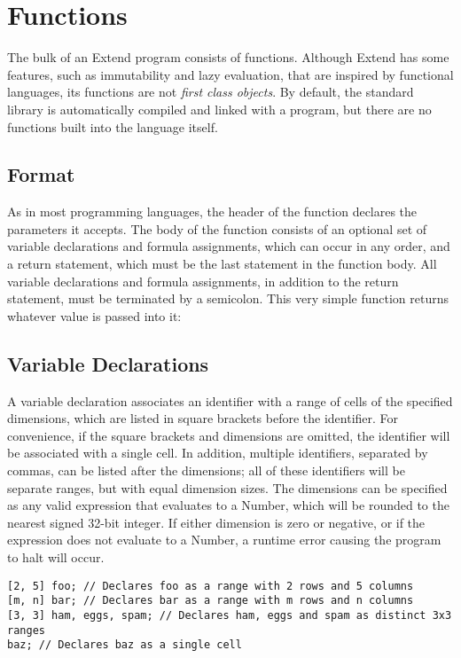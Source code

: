 \section{Functions}
\label{sec:Functions}
The bulk of an Extend program consists of functions. Although Extend has some features, such as immutability and lazy evaluation, that are inspired by functional languages, its functions are not \textit{first class objects}. By default, the standard library is automatically compiled and linked with a program, but there are no functions built into the language itself.
\subsection{Format}
\label{sec:funcdecl}
As in most programming languages, the header of the function declares the parameters it accepts. The body of the function consists of an optional set of variable declarations and formula assignments, which can occur in any order, and a return statement, which must be the last statement in the function body. All variable declarations and formula assignments, in addition to the return statement, must be terminated by a semicolon.
This very simple function returns whatever value is passed into it:

\subsection{Variable Declarations}
\label{sec:vardecl}
A variable declaration associates an identifier with a range of cells of the specified dimensions, which are listed in square brackets before the identifier. For convenience, if the square brackets and dimensions are omitted, the identifier will be associated with a single cell. In addition, multiple identifiers, separated by commas, can be listed after the dimensions; all of these identifiers will be separate ranges, but with equal dimension sizes. The dimensions can be specified as any valid expression that evaluates to a Number, which will be rounded to the nearest signed 32-bit integer. If either dimension is zero or negative, or if the expression does not evaluate to a Number, a runtime error causing the program to halt will occur.
\begin{lstlisting}
[2, 5] foo; // Declares foo as a range with 2 rows and 5 columns
[m, n] bar; // Declares bar as a range with m rows and n columns
[3, 3] ham, eggs, spam; // Declares ham, eggs and spam as distinct 3x3 ranges
baz; // Declares baz as a single cell
\end{lstlisting}
